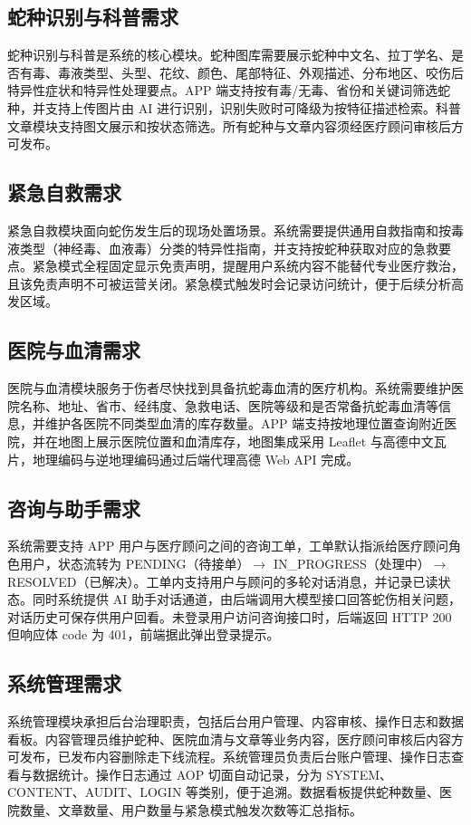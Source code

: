 \documentclass[12pt, a4paper, oneside]{ctexrep}
\begin{document}
\subsection{蛇种识别与科普需求}
蛇种识别与科普是系统的核心模块。蛇种图库需要展示蛇种中文名、拉丁学名、是否有毒、毒液类型、头型、花纹、颜色、尾部特征、外观描述、分布地区、咬伤后特异性症状和特异性处理要点。APP 端支持按有毒/无毒、省份和关键词筛选蛇种，并支持上传图片由 AI 进行识别，识别失败时可降级为按特征描述检索。科普文章模块支持图文展示和按状态筛选。所有蛇种与文章内容须经医疗顾问审核后方可发布。

\subsection{紧急自救需求}
紧急自救模块面向蛇伤发生后的现场处置场景。系统需要提供通用自救指南和按毒液类型（神经毒、血液毒）分类的特异性指南，并支持按蛇种获取对应的急救要点。紧急模式全程固定显示免责声明，提醒用户系统内容不能替代专业医疗救治，且该免责声明不可被运营关闭。紧急模式触发时会记录访问统计，便于后续分析高发区域。

\subsection{医院与血清需求}
医院与血清模块服务于伤者尽快找到具备抗蛇毒血清的医疗机构。系统需要维护医院名称、地址、省市、经纬度、急救电话、医院等级和是否常备抗蛇毒血清等信息，并维护各医院不同类型血清的库存数量。APP 端支持按地理位置查询附近医院，并在地图上展示医院位置和血清库存，地图集成采用 Leaflet 与高德中文瓦片，地理编码与逆地理编码通过后端代理高德 Web API 完成。

\subsection{咨询与助手需求}
系统需要支持 APP 用户与医疗顾问之间的咨询工单，工单默认指派给医疗顾问角色用户，状态流转为 PENDING（待接单）$\to$ IN\_PROGRESS（处理中）$\to$ RESOLVED（已解决）。工单内支持用户与顾问的多轮对话消息，并记录已读状态。同时系统提供 AI 助手对话通道，由后端调用大模型接口回答蛇伤相关问题，对话历史可保存供用户回看。未登录用户访问咨询接口时，后端返回 HTTP 200 但响应体 code 为 401，前端据此弹出登录提示。

\subsection{系统管理需求}
系统管理模块承担后台治理职责，包括后台用户管理、内容审核、操作日志和数据看板。内容管理员维护蛇种、医院血清与文章等业务内容，医疗顾问审核后内容方可发布，已发布内容删除走下线流程。系统管理员负责后台账户管理、操作日志查看与数据统计。操作日志通过 AOP 切面自动记录，分为 SYSTEM、CONTENT、AUDIT、LOGIN 等类别，便于追溯。数据看板提供蛇种数量、医院数量、文章数量、用户数量与紧急模式触发次数等汇总指标。
\end{document}
